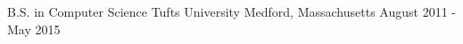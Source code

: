\begin{cventries}
  \cventry
    {B.S. in Computer Science}
    {Tufts University}
    {Medford, Massachusetts}
    {August 2011 - May 2015}
    {}
\end{cventries}
